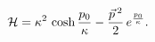 \begin{equation}\label{7} { \cal H} =
\kappa^2\, \cosh \frac{p_0}\kappa  - \frac{\vec{p}\,{}^2}{2} \, e^{
\frac{p_0}\kappa}.
\end{equation}


